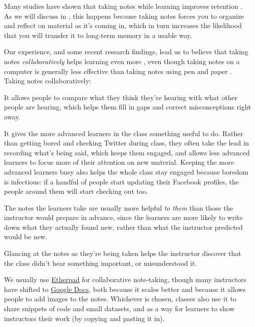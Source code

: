 
Many studies have shown that taking notes while learning improves
retention \cite{bib:aiken-note-taking,bib:bohay-note-taking}.  As we
will discuss in , this happens because taking notes
forces you to organize and reflect on material as it's coming in,
which in turn increases the likelihood that you will transfer it to
long-term memory in a usable way.

Our experience, and some recent research findings, lead us to believe
that taking notes \emph{collaboratively} helps learning even
more \cite{bib:orndorff-note-taking}, even though taking notes on a
computer is generally less effective than taking notes using pen and
paper \cite{bib:mueller-note-taking}.  Taking notes collaboratively:

\begin{gitemize}

\item
  It allows people to compare what they think they're hearing with
  what other people are hearing, which helps them fill in gaps and
  correct misconceptions right away.

\item
  It gives the more advanced learners in the class something useful to
  do.  Rather than getting bored and checking Twitter during class,
  they often take the lead in recording what's being said, which keeps
  them engaged, and allows less advanced learners to focus more of
  their attention on new material.  Keeping the more advanced learners
  busy also helps the whole class stay engaged because boredom is
  infectious: if a handful of people start updating their Facebook
  profiles, the people around them will start checking out too.

\item
  The notes the learners take are usually more helpful \emph{to them}
  than those the instructor would prepare in advance, since the learners
  are more likely to write down what they actually found new, rather than
  what the instructor predicted would be new.

\item
  Glancing at the notes as they're being taken helps the instructor
  discover that the class didn't hear something important, or
  misunderstood it.

\end{gitemize}

We usually use \href{http://etherpad.org}{Etherpad} for collaborative
note-taking, though many instructors have shifted to
\href{https://docs.google.com}{Google Docs}, both because it scales
better and because it allows people to add images to the notes.
Whichever is chosen, classes also use it to share snippets of code and
small datasets, and as a way for learners to show instructors their
work (by copying and pasting it in).

